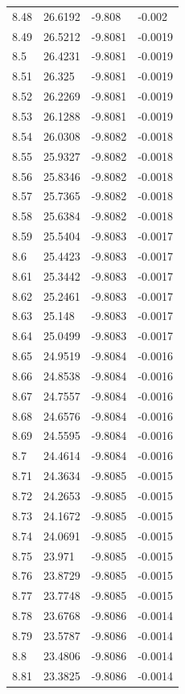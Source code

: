\begin{tabular}{llll}
8.48 & 26.6192 & -9.808 & -0.002 \\
8.49 & 26.5212 & -9.8081 & -0.0019 \\
8.5 & 26.4231 & -9.8081 & -0.0019 \\
8.51 & 26.325 & -9.8081 & -0.0019 \\
8.52 & 26.2269 & -9.8081 & -0.0019 \\
8.53 & 26.1288 & -9.8081 & -0.0019 \\
8.54 & 26.0308 & -9.8082 & -0.0018 \\
8.55 & 25.9327 & -9.8082 & -0.0018 \\
8.56 & 25.8346 & -9.8082 & -0.0018 \\
8.57 & 25.7365 & -9.8082 & -0.0018 \\
8.58 & 25.6384 & -9.8082 & -0.0018 \\
8.59 & 25.5404 & -9.8083 & -0.0017 \\
8.6 & 25.4423 & -9.8083 & -0.0017 \\
8.61 & 25.3442 & -9.8083 & -0.0017 \\
8.62 & 25.2461 & -9.8083 & -0.0017 \\
8.63 & 25.148 & -9.8083 & -0.0017 \\
8.64 & 25.0499 & -9.8083 & -0.0017 \\
8.65 & 24.9519 & -9.8084 & -0.0016 \\
8.66 & 24.8538 & -9.8084 & -0.0016 \\
8.67 & 24.7557 & -9.8084 & -0.0016 \\
8.68 & 24.6576 & -9.8084 & -0.0016 \\
8.69 & 24.5595 & -9.8084 & -0.0016 \\
8.7 & 24.4614 & -9.8084 & -0.0016 \\
8.71 & 24.3634 & -9.8085 & -0.0015 \\
8.72 & 24.2653 & -9.8085 & -0.0015 \\
8.73 & 24.1672 & -9.8085 & -0.0015 \\
8.74 & 24.0691 & -9.8085 & -0.0015 \\
8.75 & 23.971 & -9.8085 & -0.0015 \\
8.76 & 23.8729 & -9.8085 & -0.0015 \\
8.77 & 23.7748 & -9.8085 & -0.0015 \\
8.78 & 23.6768 & -9.8086 & -0.0014 \\
8.79 & 23.5787 & -9.8086 & -0.0014 \\
8.8 & 23.4806 & -9.8086 & -0.0014 \\
8.81 & 23.3825 & -9.8086 & -0.0014 \\

\end{tabular}
